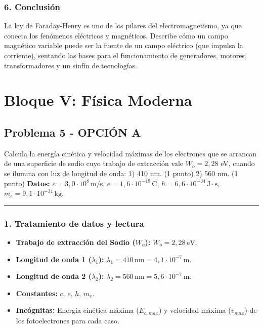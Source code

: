 \subsubsection*{6. Conclusión}
\begin{cajaconclusion}
La ley de Faraday-Henry es uno de los pilares del electromagnetismo, ya que conecta los fenómenos eléctricos y magnéticos. Describe cómo un campo magnético variable puede ser la fuente de un campo eléctrico (que impulsa la corriente), sentando las bases para el funcionamiento de generadores, motores, transformadores y un sinfín de tecnologías.
\end{cajaconclusion}

\newpage

\section{Bloque V: Física Moderna}
\label{sec:moderna_2009_sep_ext_1}

\subsection{Problema 5 - OPCIÓN A}
\label{subsec:5A_2009_sep_ext}

\begin{cajaenunciado}
Calcula la energía cinética y velocidad máximas de los electrones que se arrancan de una superficie de sodio cuyo trabajo de extracción vale $W_{o}=2,28$ eV, cuando se ilumina con luz de longitud de onda:
1) 410 nm. (1 punto)
2) 560 nm. (1 punto)
\textbf{Datos:} $c=3,0\cdot10^{8}\,\text{m/s}$, $e=1,6\cdot10^{-19}\,\text{C}$, $h=6,6\cdot10^{-34}\,\text{J}\cdot\text{s}$, $m_e=9,1\cdot10^{-31}\,\text{kg}$.
\end{cajaenunciado}
\hrule

\subsubsection*{1. Tratamiento de datos y lectura}
\begin{itemize}
    \item \textbf{Trabajo de extracción del Sodio ($W_o$):} $W_o = 2,28 \, \text{eV}$.
    \item \textbf{Longitud de onda 1 ($\lambda_1$):} $\lambda_1 = 410 \, \text{nm} = 4,1 \cdot 10^{-7} \, \text{m}$.
    \item \textbf{Longitud de onda 2 ($\lambda_2$):} $\lambda_2 = 560 \, \text{nm} = 5,6 \cdot 10^{-7} \, \text{m}$.
    \item \textbf{Constantes:} $c$, $e$, $h$, $m_e$.
    \item \textbf{Incógnitas:} Energía cinética máxima ($E_{c,max}$) y velocidad máxima ($v_{max}$) de los fotoelectrones para cada caso.
\end{itemize}

